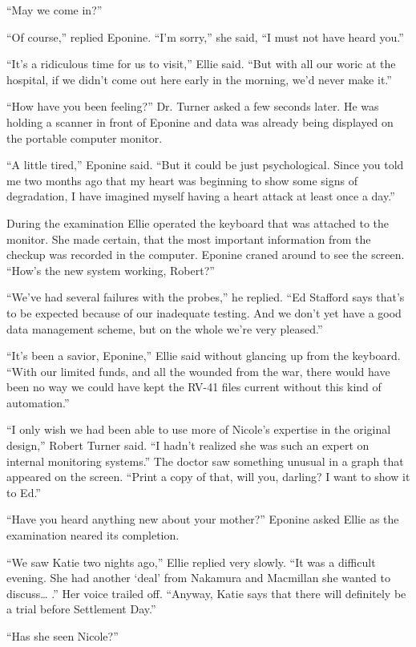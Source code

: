 \documentclass[]{article}
\begin{document}
{{“May we come in?”

“Of course,” replied Eponine. “I’m sorry,” she said, “I must not have heard you.”

“It’s a ridiculous time for us to visit,” Ellie said. “But with all our woric at the hospital, if we didn’t come out here early in the morning, we’d never make it.”

“How have you been feeling?” Dr. Turner asked a few seconds later. He was holding a scanner in front of Eponine and data was already being displayed on the portable computer monitor.

“A little tired,” Eponine said. “But it could be just psychological. Since you told me two months ago that my heart was beginning to show some signs of degradation, I have imagined myself having a heart attack at least once a day.”

During the examination Ellie operated the keyboard that was attached to the monitor. She made certain, that the most important information from the checkup was recorded in the computer. Eponine craned around to see the screen. “How’s the new system working, Robert?”

“We’ve had several failures with the probes,” he replied. “Ed Stafford says that’s to be expected because of our inadequate testing. And we don’t yet have a good data management scheme, but on the whole we’re very pleased.”

“It’s been a savior, Eponine,” Ellie said without glancing up from the keyboard. “With our limited funds, and all the wounded from the war, there would have been no way we could have kept the RV-41 files current without this kind of automation.”

“I only wish we had been able to use more of Nicole’s expertise in the original design,” Robert Turner said. “I hadn’t realized she was such an expert on internal monitoring systems.” The doctor saw something unusual in a graph that appeared on the screen. “Print a copy of that, will you, darling? I want to show it to Ed.”

“Have you heard anything new about your mother?” Eponine asked Ellie as the examination neared its completion.

“We saw Katie two nights ago,” Ellie replied very slowly. “It was a difficult evening. She had another ‘deal’ from Nakamura and Macmillan she wanted to discuss… .” Her voice trailed off. “Anyway, Katie says that there will definitely be a trial before Settlement Day.”

“Has she seen Nicole?”

}}
\end{document}
